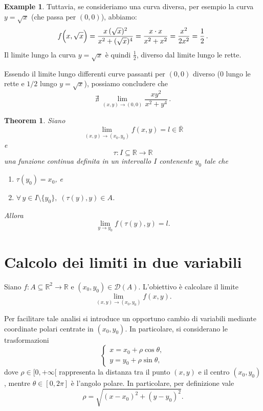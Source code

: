 \documentclass{article}
\theoremstyle{plain}
\newtheorem{thm}{Theorem}[section]
\theoremstyle{definition}
\newtheorem{exmp}{Example}[section]
\theoremstyle{remark}
\begin{document}
\begin{exmp}
    Tuttavia, se consideriamo una curva diversa, per esempio la curva \(y=\sqrt{x}\) (che passa per \((0,0)\)), abbiamo:
    \[
    f\Bigl(x,\sqrt{x}\Bigr)=\frac{x\,( \sqrt{x})^2}{x^2+ (\sqrt{x})^4}
    =\frac{x\cdot x}{x^2+x^2}
    =\frac{x^2}{2x^2}=\frac{1}{2}\,.
    \]
    Il limite lungo la curva \(y=\sqrt{x}\) è quindi \(\frac{1}{2}\), diverso dal limite lungo le rette.

    Essendo il limite lungo differenti curve passanti per \((0,0)\) diverso (0 lungo le rette e \(1/2\) lungo \(y=\sqrt{x}\)), possiamo concludere che
    \[
    \nexists\,\lim_{(x,y)\to(0,0)} \frac{xy^2}{x^2+y^4}\,.
    \]
\end{exmp}

\vspace{10pt}

\begin{bxthm}
\begin{thm}
    Siano \[\lim_{(x,y)\to(x_0,y_0)}f(x,y)=l\in\overline{\mathbb{R}}\] e 
    \[\tau :I\subseteq\mathbb{R}\to\mathbb{R}\]
    una funzione continua definita in un intervallo $I$ contenente $y_0$ tale che 
    \begin{enumerate}
        \item $\tau(y_0)=x_0$, e 
        \item $\forall\, y\in I\setminus\{y_0\},\;(\tau(y),y)\in A$.
    \end{enumerate}
    Allora 
    \[\lim_{y\to y_0}f(\tau(y),y)=l.\]
\end{thm}
\end{bxthm}

\vspace{10pt}

\section{Calcolo dei limiti in due variabili}

\vspace{10pt}


Siano $f:A\subseteq\mathbb{R}^2\to\mathbb{R}$ e $(x_0,y_0)\in\mathcal{D}(A)$.
L'obiettivo è calcolare il limite
\[
\lim_{(x,y) \to (x_0,y_0)} f(x,y).
\]

Per facilitare tale analisi si introduce un opportuno cambio di variabili mediante coordinate polari centrate in \((x_0,y_0)\). In particolare, si considerano le trasformazioni
\[
\begin{cases}
x = x_0 + \rho\cos\theta, \\[1mm]
y = y_0 + \rho\sin\theta,
\end{cases}
\]
dove \(\rho\in[0,+\infty[\) rappresenta la distanza tra il punto \((x,y)\) e il centro \((x_0,y_0)\), mentre \(\theta\in[0,2\pi]\) è l'angolo polare. 
In particolare, per definizione vale
\[
\rho = \sqrt{(x-x_0)^2 + (y-y_0)^2}.
\]
\end{document}
